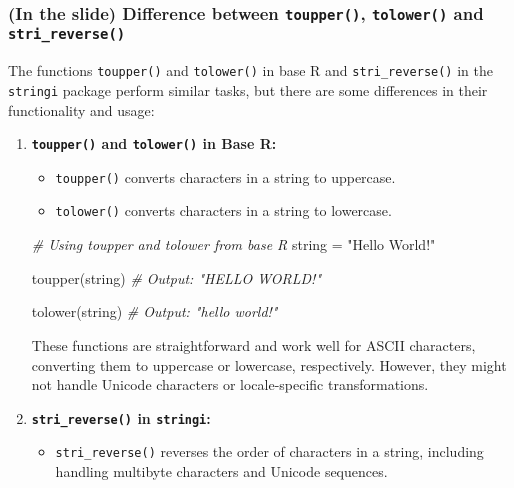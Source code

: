 \documentclass[
]{article}
\newenvironment{Shaded}{}{}
\newcommand{\CommentTok}[1]{\textcolor[rgb]{0.38,0.63,0.69}{\textit{#1}}}
\newcommand{\FunctionTok}[1]{\textcolor[rgb]{0.02,0.16,0.49}{#1}}
\newcommand{\NormalTok}[1]{#1}
\newcommand{\OtherTok}[1]{\textcolor[rgb]{0.00,0.44,0.13}{#1}}
\newcommand{\StringTok}[1]{\textcolor[rgb]{0.25,0.44,0.63}{#1}}
\begin{document}
\hypertarget{in-the-slide-difference-between-toupper-tolower-and-strireverse}{%
\subsubsection{\texorpdfstring{\textbf{(In the slide)} Difference
between \texttt{toupper()}, \texttt{tolower()} and
\texttt{stri\_reverse()}}{(In the slide) Difference between toupper(), tolower() and stri\_reverse()}}\label{in-the-slide-difference-between-toupper-tolower-and-strireverse}}

The functions \texttt{toupper()} and \texttt{tolower()} in base R and
\texttt{stri\_reverse()} in the \texttt{stringi} package perform similar
tasks, but there are some differences in their functionality and usage:

\begin{enumerate}
\def\labelenumi{\arabic{enumi}.}
\item
  \textbf{\texttt{toupper()} and \texttt{tolower()} in Base R:}

  \begin{itemize}
  \item
    \texttt{toupper()} converts characters in a string to uppercase.
  \item
    \texttt{tolower()} converts characters in a string to lowercase.
  \end{itemize}

\begin{Shaded}
\begin{Highlighting}[]
\CommentTok{\# Using toupper and tolower from base R}
\NormalTok{string }\OtherTok{=} \StringTok{"Hello World!"}

\FunctionTok{toupper}\NormalTok{(string)}
\CommentTok{\# Output: "HELLO WORLD!"}

\FunctionTok{tolower}\NormalTok{(string)}
\CommentTok{\# Output: "hello world!"}
\end{Highlighting}
\end{Shaded}

  These functions are straightforward and work well for ASCII
  characters, converting them to uppercase or lowercase, respectively.
  However, they might not handle Unicode characters or locale-specific
  transformations.
\item
  \textbf{\texttt{stri\_reverse()} in \texttt{stringi}:}

  \begin{itemize}
  \item
    \texttt{stri\_reverse()} reverses the order of characters in a
    string, including handling multibyte characters and Unicode
    sequences.
  \end{itemize}


\end{enumerate}
\end{document}
